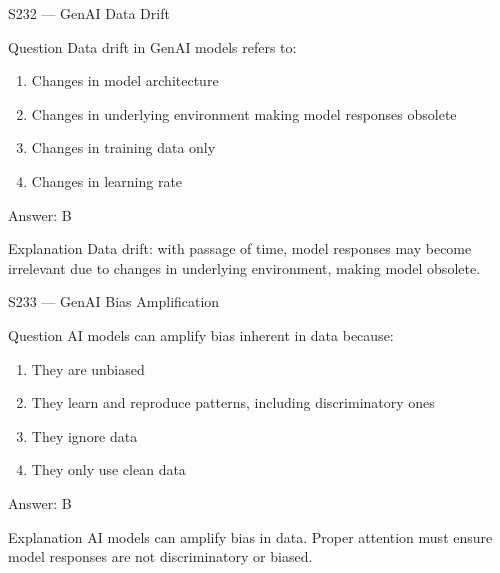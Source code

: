 \documentclass[aspectratio=169,8pt]{beamer}
\begin{document}
\begin{frame}{S232 --- GenAI Data Drift}
	\begin{block}{Question}
		Data drift in GenAI models refers to:
		\begin{enumerate}
			\item Changes in model architecture
			\item Changes in underlying environment making model responses obsolete
			\item Changes in training data only
			\item Changes in learning rate
		\end{enumerate}
	\end{block}
	\begin{exampleblock}{Answer: B}\end{exampleblock}
	\begin{block}{Explanation}
		Data drift: with passage of time, model responses may become irrelevant due to changes in underlying environment, making model obsolete.
	\end{block}
\end{frame}

\begin{frame}{S233 --- GenAI Bias Amplification}
	\begin{block}{Question}
		AI models can amplify bias inherent in data because:
		\begin{enumerate}
			\item They are unbiased
			\item They learn and reproduce patterns, including discriminatory ones
			\item They ignore data
			\item They only use clean data
		\end{enumerate}
	\end{block}
	\begin{exampleblock}{Answer: B}\end{exampleblock}
	\begin{block}{Explanation}
		AI models can amplify bias in data. Proper attention must ensure model responses are not discriminatory or biased.
	\end{block}
\end{frame}
\end{document}

